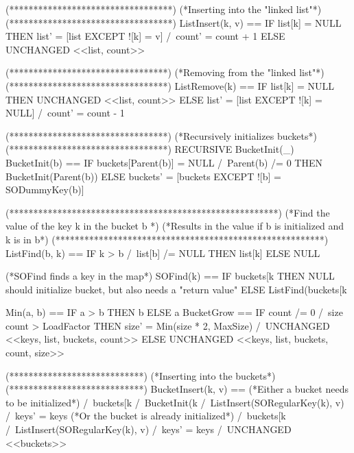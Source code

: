 \documentclass{uit-thesis}
\begin{document}
\begin{tla}
                     
                     (**********************************)
                     (*Inserting into the "linked list"*)
                     (**********************************)
                     ListInsert(k, v) == IF list[k] = NULL
                     THEN list' = [list EXCEPT ![k] = v] /\ count' = count + 1
                     ELSE UNCHANGED <<list, count>>
                     
                     (*********************************)
                     (*Removing from the "linked list"*)
                     (*********************************)
                     ListRemove(k) == IF list[k] = NULL
                     THEN UNCHANGED <<list, count>>
                     ELSE list' = [list EXCEPT ![k] = NULL] /\ count' = count - 1
                     
                     (*********************************)
                     (*Recursively initializes buckets*)
                     (*********************************)
                     RECURSIVE BucketInit(_)
                     BucketInit(b) == IF buckets[Parent(b)] = NULL /\ Parent(b) /= 0
                     THEN BucketInit(Parent(b))
                     ELSE buckets' = [buckets EXCEPT ![b] = SODummyKey(b)]
                     
                     (********************************************************)
                     (*Find the value of the key k in the bucket b           *)
                     (*Results in the value if b is initialized and k is in b*)
                     (********************************************************)
                     ListFind(b, k) == IF k > b /\ list[b] /= NULL THEN list[k] ELSE NULL
                     
                     (*SOFind finds a key in the map*)
                     SOFind(k) == IF buckets[k %
                     THEN NULL \* should initialize bucket, but also needs a "return value"
                     ELSE ListFind(buckets[k %
                     
                     Min(a, b) == IF a > b THEN b ELSE a
                     BucketGrow == IF count /= 0 /\ size \div count > LoadFactor
                     THEN size' = Min(size * 2, MaxSize) /\ UNCHANGED <<keys, list, buckets, count>> 
                     ELSE UNCHANGED <<keys, list, buckets, count, size>>
                     
                     (****************************)
                     (*Inserting into the buckets*)
                     (****************************)
                     BucketInsert(k, v) == (*Either a bucket needs to be initialized*)
                     \/  /\ buckets[k %
                     /\ BucketInit(k %
                     /\ ListInsert(SORegularKey(k), v)
                     /\ keys' = keys                       
                     (*Or the bucket is already initialized*)
                     \/  /\ buckets[k %
                     /\ ListInsert(SORegularKey(k), v)
                     /\ keys' = keys 
                     /\ UNCHANGED <<buckets>>
                     

\end{tla}
\end{document}
